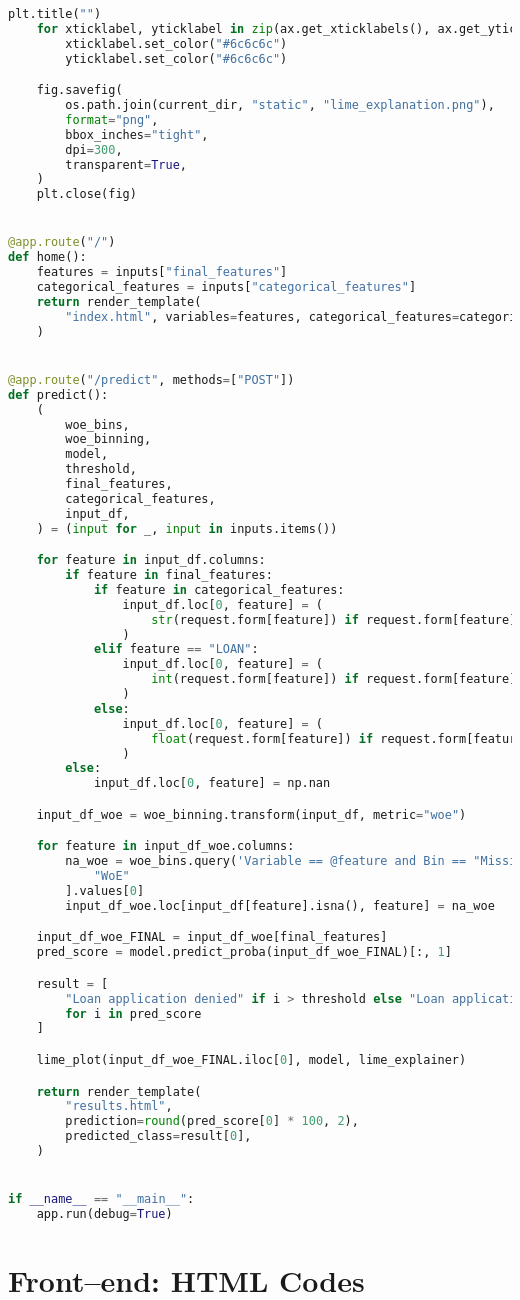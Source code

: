 \begin{lstlisting}[language=Python, basicstyle=\footnotesize\ttfamily]
	plt.title("")
	for xticklabel, yticklabel in zip(ax.get_xticklabels(), ax.get_yticklabels()):
		xticklabel.set_color("#6c6c6c")
		yticklabel.set_color("#6c6c6c")

	fig.savefig(
		os.path.join(current_dir, "static", "lime_explanation.png"),
		format="png",
		bbox_inches="tight",
		dpi=300,
		transparent=True,
	)
	plt.close(fig)


@app.route("/")
def home():
	features = inputs["final_features"]
	categorical_features = inputs["categorical_features"]
	return render_template(
		"index.html", variables=features, categorical_features=categorical_features
	)


@app.route("/predict", methods=["POST"])
def predict():
	(
		woe_bins,
		woe_binning,
		model,
		threshold,
		final_features,
		categorical_features,
		input_df,
	) = (input for _, input in inputs.items())

	for feature in input_df.columns:
		if feature in final_features:
			if feature in categorical_features:
				input_df.loc[0, feature] = (
					str(request.form[feature]) if request.form[feature] else np.nan
				)
			elif feature == "LOAN":
				input_df.loc[0, feature] = (
					int(request.form[feature]) if request.form[feature] else np.nan
				)
			else:
				input_df.loc[0, feature] = (
					float(request.form[feature]) if request.form[feature] else np.nan
				)
		else:
			input_df.loc[0, feature] = np.nan

	input_df_woe = woe_binning.transform(input_df, metric="woe")

	for feature in input_df_woe.columns:
		na_woe = woe_bins.query('Variable == @feature and Bin == "Missing"')[
			"WoE"
		].values[0]
		input_df_woe.loc[input_df[feature].isna(), feature] = na_woe

	input_df_woe_FINAL = input_df_woe[final_features]
	pred_score = model.predict_proba(input_df_woe_FINAL)[:, 1]

	result = [
		"Loan application denied" if i > threshold else "Loan application approved"
		for i in pred_score
	]

	lime_plot(input_df_woe_FINAL.iloc[0], model, lime_explainer)

	return render_template(
		"results.html",
		prediction=round(pred_score[0] * 100, 2),
		predicted_class=result[0],
	)


if __name__ == "__main__":
	app.run(debug=True)	
\end{lstlisting}

\section{Front--end: HTML Codes}

